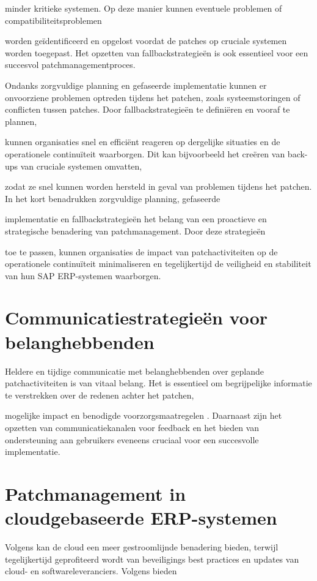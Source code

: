 minder kritieke systemen. Op deze manier kunnen eventuele problemen of compatibiliteitsproblemen

worden geïdentificeerd en opgelost voordat de patches op cruciale systemen worden toegepast. Het opzetten van fallbackstrategieën is ook essentieel voor een succesvol patchmanagementproces.

Ondanks zorgvuldige planning en gefaseerde implementatie kunnen er onvoorziene problemen optreden tijdens het patchen, zoals systeemstoringen of conflicten tussen patches. Door fallbackstrategieën te definiëren en vooraf te plannen,

kunnen organisaties snel en efficiënt reageren op dergelijke situaties en de operationele continuïteit waarborgen. Dit kan bijvoorbeeld het creëren van back-ups van cruciale systemen omvatten, 

zodat ze snel kunnen worden hersteld in geval van problemen tijdens het patchen. In het kort benadrukken zorgvuldige planning, gefaseerde

implementatie en fallbackstrategieën het belang van een proactieve en strategische benadering van patchmanagement. Door deze strategieën

toe te passen, kunnen organisaties de impact van patchactiviteiten op de operationele continuïteit minimaliseren en tegelijkertijd de veiligheid en stabiliteit van hun SAP ERP-systemen waarborgen.

\section{Communicatiestrategieën voor belanghebbenden}
Heldere en tijdige communicatie met belanghebbenden over geplande patchactiviteiten is van vitaal belang. Het is essentieel om begrijpelijke informatie te verstrekken over de redenen achter het patchen,

mogelijke impact en benodigde voorzorgsmaatregelen \autocite{Toren2019}. Daarnaast zijn het opzetten van communicatiekanalen voor feedback en het bieden van ondersteuning aan gebruikers eveneens cruciaal voor een succesvolle implementatie.


\section{Patchmanagement in cloudgebaseerde ERP-systemen}
Volgens \textcite{Forbes2021} kan de cloud een meer gestroomlijnde benadering bieden, terwijl tegelijkertijd geprofiteerd wordt van beveiligings best practices en updates van cloud- en softwareleveranciers. Volgens \textcite{Ruiter2024} bieden

